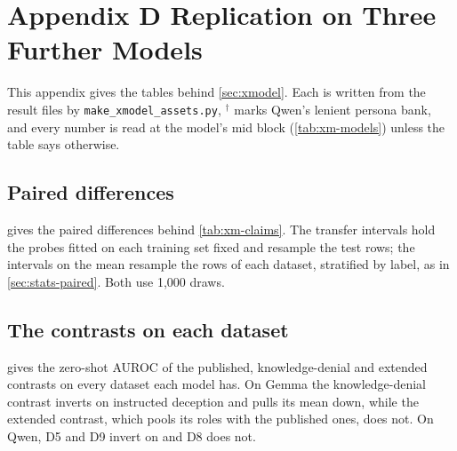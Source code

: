 \chapter*{Appendix D \quad Replication on Three Further Models}
\label{app:xmodel}

This appendix gives the tables behind \cref{sec:xmodel}. Each is written from the result files by
\texttt{make\_xmodel\_assets.py}, $^\dagger$ marks Qwen's lenient persona bank, and every number is read at
the model's mid block (\cref{tab:xm-models}) unless the table says otherwise.

\section*{Paired differences}

 gives the paired differences behind \cref{tab:xm-claims}. The transfer intervals
hold the probes fitted on each training set fixed and resample the test rows; the intervals on the mean
resample the rows of each dataset, stratified by label, as in \cref{sec:stats-paired}. Both use 1,000
draws.

\begin{table}[htbp]
\centering
\footnotesize
\setlength{\tabcolsep}{3pt}
\caption[Paired differences at each model's mid block.]{Paired differences at each model's mid block, with 95\% intervals. The mean is over the model's
own datasets; the RepE probe is the base probe D2 trained at the same block.}
\label{tab:xm-intervals}
\fittable{}
\end{table}

\section*{The contrasts on each dataset}

 gives the zero-shot AUROC of the published, knowledge-denial and extended
contrasts on every dataset each model has. On Gemma the knowledge-denial contrast inverts on instructed
deception and pulls its mean down, while the extended contrast, which pools its roles with the published
ones, does not. On Qwen, D5 and D9 invert on \hpkr{} and D8 does not.

\begin{table}[htbp]
\centering
\footnotesize
\caption[Zero-shot AUROC per dataset at each model's mid block.]{Zero-shot AUROC per dataset at each model's mid block; n/a marks a dataset Liars' Bench does not
evaluate the model on. The mean is over the model's Liars' Bench datasets, without RepE.}
\label{tab:xm-zeroshot}
\fittable{}
\end{table}

